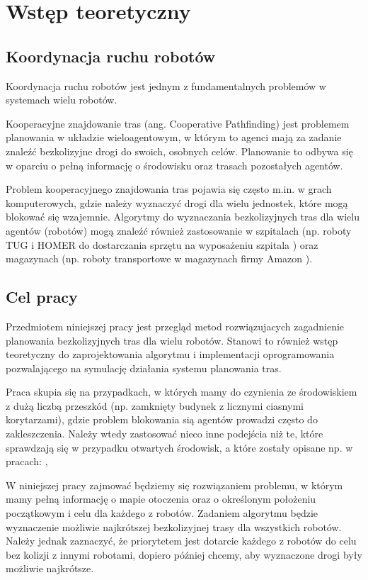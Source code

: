 \chapter{Wstęp teoretyczny}
\label{ch:wstept}

\section{Koordynacja ruchu robotów}
Koordynacja ruchu robotów jest jednym z fundamentalnych problemów w systemach wielu robotów. \cite{optpriorities}

Kooperacyjne znajdowanie tras (ang. Cooperative Pathfinding) jest problemem planowania w układzie wieloagentowym, w którym to agenci mają za zadanie znaleźć bezkolizyjne drogi do swoich, osobnych celów. Planowanie to odbywa się w oparciu o pełną informację o środowisku oraz trasach pozostałych agentów. \cite{cooppath}

Problem kooperacyjnego znajdowania tras pojawia się często m.in. w grach komputerowych, gdzie należy wyznaczyć drogi dla wielu jednostek, które mogą blokować się wzajemnie. Algorytmy do wyznaczania bezkolizyjnych tras dla wielu agentów (robotów) mogą znaleźć również zastosowanie w szpitalach (np. roboty TUG i HOMER do dostarczania sprzętu na wyposażeniu szpitala \cite{tughomer}) oraz magazynach (np. roboty transportowe w magazynach firmy Amazon \cite{amazonrobots}).

\section{Cel pracy}
Przedmiotem niniejszej pracy jest przegląd metod rozwiązujacych zagadnienie planowania bezkolizyjnych tras dla wielu robotów. Stanowi to również wstęp teoretyczny do zaprojektowania algorytmu i implementacji oprogramowania pozwalającego na symulację działania systemu planowania tras.

Praca skupia się na przypadkach, w których mamy do czynienia ze środowiskiem z dużą liczbą przeszkód (np. zamknięty budynek z licznymi ciasnymi korytarzami), gdzie problem blokowania sią agentów prowadzi często do zakleszczenia. Należy wtedy zastosować nieco inne podejścia niż te, które sprawdzają się w przypadku otwartych środowisk, a które zostały opisane np. w pracach: \cite{roszkowska}, \cite{siemiatkowska}

W niniejszej pracy zajmować będziemy się rozwiązaniem problemu, w którym mamy pełną informację o mapie otoczenia oraz o określonym położeniu początkowym i celu dla każdego z robotów. Zadaniem algorytmu będzie wyznaczenie możliwie najkrótszej bezkolizyjnej trasy dla wszystkich robotów. Należy jednak zaznaczyć, że priorytetem jest dotarcie każdego z robotów do celu bez kolizji z innymi robotami, dopiero później chcemy, aby wyznaczone drogi były możliwie najkrótsze.

